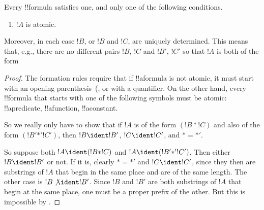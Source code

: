 \documentclass[../../../include/open-logic-section]{subfiles}
\begin{document}
\begin{prop}
Every !!{formula} satisfies one, and only one of the following conditions.
\begin{enumerate}
\item $!A$ is atomic.







\end{enumerate}
Moreover, in each case $!B$, or $!B$ and $!C$, are uniquely
determined.  This means that, e.g., there are no different pairs $!B$,
$!C$ and $!B'$, $!C'$ so that $!A$ is both of the form 
\end{prop}

\begin{proof}
The formation rules require that if !!a{formula} is not atomic, it
must start with an opening parenthesis~(, 
or with a quantifier. On the other hand, every !!{formula} that starts with
one of the following symbols must be atomic: !!a{predicate}, !!a{function}, !!a{constant}.

So we really only have to show that if $!A$ is of the form $(!B \ast
!C)$ and also of the form $(!B' \mathbin{\ast'} !C')$, then $!B \ident
!B'$, $!C \ident !C'$, and $\ast = {\ast'}$.

So suppose both $!A \ident (!B \ast !C)$ and $!A \ident (!B'
\mathbin{\ast'} !C')$.  Then either $!B \ident !B'$ or not.  If it is,
clearly $\ast = {\ast'}$ and $!C \ident !C'$, since they then are
substrings of $!A$ that begin in the same place and are of the same
length.  The other case is $!B \not\ident !B'$.  Since $!B$ and
$!B'$ are both substrings of $!A$ that begin at the same place, one
must be a proper prefix of the other.  But this is impossible by
.
\end{proof}
\end{document}
